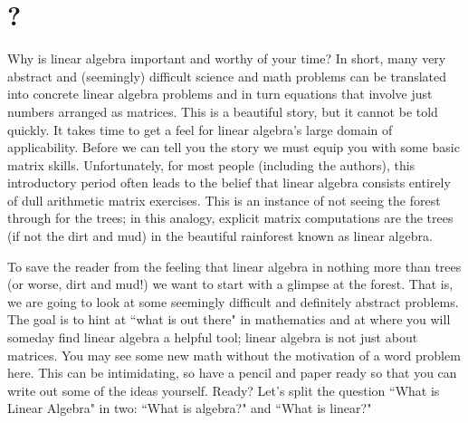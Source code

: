 \chapter{\whatIsTitle?}\label{warmup}



Why is linear algebra important and worthy of your time? 
In short, many very abstract and (seemingly) difficult science and math problems %
can be translated into concrete linear algebra problems and in turn equations that involve just numbers arranged as matrices. 
This is a beautiful story, but it cannot be told quickly. 
It takes time to get a feel for linear algebra's large domain of applicability. 
Before we can tell you the story we must equip you with some basic matrix skills.  
Unfortunately, for most people (including the authors), 
this introductory period often leads to the 
belief that linear algebra consists 
entirely of dull arithmetic matrix exercises. 
This is an instance of not seeing the forest through for the trees; 
in this analogy, explicit matrix computations are the trees (if not the dirt and mud) in the beautiful rainforest known as linear algebra. 

To  save the reader from the feeling that linear algebra in nothing more than trees 
(or worse, dirt and mud!)  
we want to start with a glimpse at the forest. 
That is, we are going to look at some  seemingly difficult and definitely abstract problems. 
The goal is to hint at ``what is out there" in mathematics and at where you will someday find linear algebra a helpful tool; linear algebra is not just about matrices. 
You may see some new math without the motivation of a word problem here.
This can be intimidating, so have a pencil and paper ready so that you can write out some of the ideas yourself. Ready? Let's split the question ``What is Linear Algebra" in two: ``What is algebra?" and  ``What is linear?"\\  





\newpage
\noindent 
